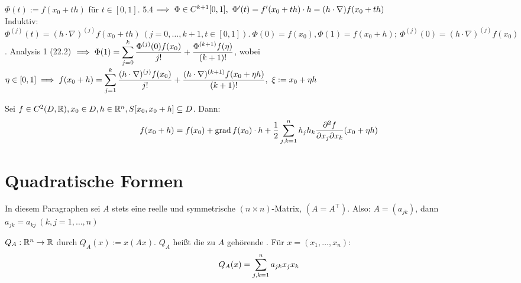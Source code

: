 \documentclass[a4paper,oneside,DIV15,BCOR12mm,chapterprefix=true,headings=onelinechapter]{scrbook}
\begin{document}
\begin{beweis}
$\Phi(t):=f(x_0+th)$ für $t\in[0,1]$. 5.4$\folgt \Phi \in C^{k+1}[0,1],\ \Phi'(t)=f'(x_0+th) \cdot h=(h \cdot \nabla)f(x_0+th)$\\
Induktiv: $\Phi^{(j)}(t)=(h\cdot\nabla)^{(j)}f(x_0+th)\ (j=0,\ldots,k+1, t\in[0,1]).\ \Phi(0)=f(x_0), \Phi(1)=f(x_0+h);\ \Phi^{(j)}(0)=(h\cdot\nabla)^{(j)}f(x_0)$. Analysis 1 (22.2) $\implies \Phi(1)=\displaystyle\sum_{j=0}^k\frac{\Phi^{(j)}(0)f(x_0)}{j!}+\frac{\Phi^{(k+1)}f(\eta)}{(k+1)!}$, wobei $\eta\in[0,1]\implies f(x_0+h)=\displaystyle\sum_{j=1}^k\frac{(h\cdot\nabla)^{(j)}f(x_0)}{j!}+\frac{(h\cdot\nabla)^{(k+1)}f(x_0+\eta h)}{(k+1)!},\ \xi:=x_0+\eta h$
\end{beweis}

\begin{spezialfall}
Sei $f\in C^2(D,\mathbb{R}),x_0\in D, h\in \mathbb{R}^n, S[x_0,x_0+h]\subseteq D$. Dann: 
$$f(x_0+h)=f(x_0)+\grad f(x_0)\cdot h+\frac{1}{2}\sum_{j,k=1}^nh_jh_k\frac{\partial^2 f}{\partial x_j\partial x_k}(x_0+\eta h)$$
\end{spezialfall}

\chapter{Quadratische Formen}
\def\grad{\mathop{\rm grad}\nolimits}

\begin{vereinbarung}
In diesem Paragraphen sei $A$ stets eine reelle und symmetrische $(n\times n)$-Matrix, $(A=A^\top)$. Also: $A=(a_{jk})$, dann $a_{jk}=a_{kj}\ (k,j=1,\ldots,n)$ 
\end{vereinbarung}

\begin{definition*}
$Q_A:\mathbb{R}^n\to\mathbb{R}$ durch $Q_A(x):=x(Ax)$. $Q_A$ heißt die zu $A$ gehörende . Für $x=(x_1,\ldots,x_n):$
$$Q_A(x)=\displaystyle\sum_{j,k=1}^na_{jk}x_jx_k$$
\end{definition*}
\end{document}
